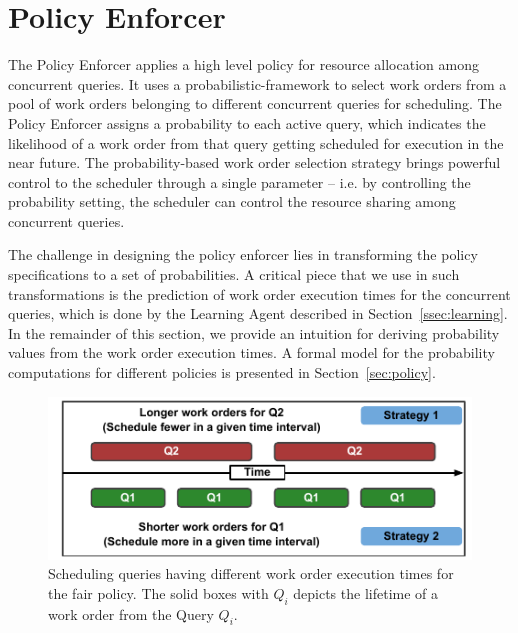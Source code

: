 
\section{Policy Enforcer}\label{apx:policy-enforcer}
The Policy Enforcer applies a high level policy for resource allocation among concurrent queries. 
It uses a probabilistic-framework to select work orders from a pool of work orders 
belonging to different concurrent queries for scheduling. 
The Policy Enforcer assigns a probability to each active query, which indicates the likelihood of a work order from that query getting scheduled for execution in the near future. 
The probability-based work order selection strategy brings powerful control to the scheduler through a single parameter -- i.e. by controlling the probability 
setting, the scheduler can control the resource sharing among concurrent queries. 

The challenge in designing the policy enforcer lies in transforming the policy specifications to a set of probabilities. 
A critical piece that we use in such transformations is the prediction of work order 
execution times for the concurrent queries, which is done by the Learning Agent described in Section~\ref{ssec:learning}. %
In the remainder of this section, we provide an intuition for deriving probability values from the work order execution times. 
A formal model for the probability computations for different policies is presented in Section~\ref{sec:policy}.

\begin{figure}[]
	\centering
	\includegraphics[width=\columnwidth]{figures/Probability-explanation.pdf}
	\vspace{-2em}
	\caption{Scheduling queries having different work order execution times for the fair policy. The solid boxes with $Q_{i}$ depicts the lifetime of a work order from the Query $Q_{i}$.}
	\label{fig:probability-explanation}
\end{figure}

